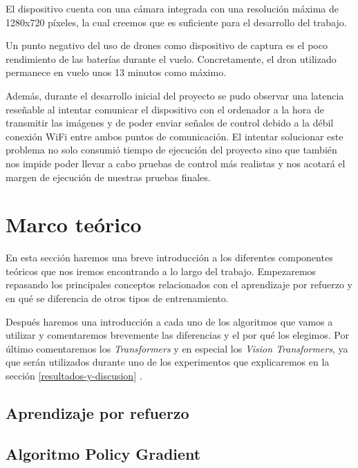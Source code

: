 El dispositivo cuenta con una cámara integrada con una resolución máxima de 1280x720 píxeles, la cual creemos que es suficiente para el desarrollo del trabajo.
\medskip

Un punto negativo del uso de drones como dispositivo de captura es el poco rendimiento de las baterías durante el vuelo. Concretamente, el dron utilizado permanece en vuelo unos 13 minutos como máximo.
\medskip

Además, durante el desarrollo inicial del proyecto se pudo observar una latencia reseñable al intentar comunicar el dispositivo con el ordenador a la hora de transmitir las imágenes y de poder enviar señales de control debido a la débil conexión WiFi entre ambos puntos de comunicación. El intentar solucionar este problema no solo consumió tiempo de ejecución del proyecto sino que también nos impide poder llevar a cabo pruebas de control más realistas y nos acotará el margen de ejecución de nuestras pruebas finales.
\medskip

\section{Marco teórico}

En esta sección haremos una breve introducción a los diferentes componentes teóricos que nos iremos encontrando a lo largo del trabajo. Empezaremos repasando los principales conceptos relacionados con el aprendizaje por refuerzo y en qué se diferencia de otros tipos de entrenamiento. 
\medskip

Después haremos una introducción a cada uno de los algoritmos que vamos a utilizar y comentaremos brevemente las diferencias y el por qué los elegimos.
Por último comentaremos los \textit{Transformers}\citep{transformers} y en especial los \textit{Vision Transformers}\citep{visiontransformers}, ya que serán utilizados durante uno de los experimentos que explicaremos en la sección \ref{resultados-y-discusion} .
\medskip

\subsection{Aprendizaje por refuerzo}
\label{aprendizaje-por-refuerzo}

\subsection{Algoritmo Policy Gradient}
\label{algoritmo-policy-gradient}

